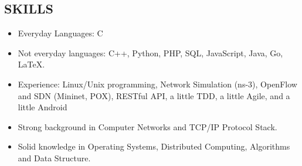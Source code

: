 \documentclass[line]{res}
\begin{document}
\begin{resume}
	\section{SKILLS}
	\begin{itemize}
		\item Everyday Languages: C
		\item Not everyday languages: C++, Python, PHP, SQL, JavaScript, Java, Go, LaTeX.
		\item Experience: Linux/Unix programming, Network Simulation (ns-3), OpenFlow and SDN (Mininet, POX), RESTful API, a little TDD, a little Agile, and a little Android
		\item Strong background in Computer Networks and TCP/IP Protocol Stack.
		\item Solid knowledge in Operating Systems, Distributed Computing, Algorithms and Data Structure.
	\end{itemize}


\end{resume}
\end{document}
